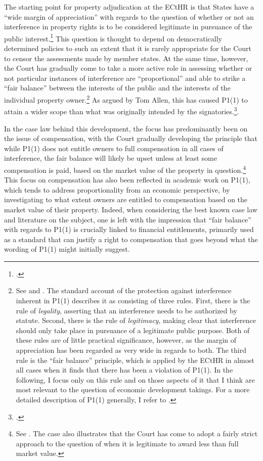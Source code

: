 \documentclass[12pt,a4paper]{book} %
\begin{document}
The starting point for property adjudication at the ECtHR is that States have a ``wide margin of appreciation'' with regards to the question of whether or not an interference in property rights is to be considered legitimate in pursuance of the public interest.\footcite[See][54]{james86} This question is thought to depend on democratically determined policies to such an extent that it is rarely appropriate for the Court to censor the assessments made by member states. At the same time, however, the Court has gradually come to take a more active role in assessing whether or not particular instances of interference are ``proportional'' and able to strike a ``fair balance'' between the interests of the public and the interests of the individual property owner.\footnote{See \cite[69]{sporrong82} and \cite[120]{james86}. The standard account of the protection against interference inherent in P1(1) describes it as consisting of three rules. First, there is the rule of {\it legality}, asserting that an interference needs to be authorized by statute. Second, there is the rule of {\it legitimacy}, making clear that interference should only take place in pursuance of a legitimate public purpose. Both of these rules are of little practical significance, however, as the margin of appreciation has been regarded as very wide in regards to both. The third rule is the ``fair balance'' principle, which is applied by the ECtHR in almost all cases when it finds that there has been a violation of P1(1). In the following, I focus only on this rule and on those aspects of it that I think are most relevant to the question of economic development takings. For a more detailed description of P1(1) generally, I refer to \cite{allen05}.} As argued by Tom Allen, this has caused P1(1) to attain a wider scope than what was originally intended by the signatories.\footcite[1055]{allen10}.

In the case law behind this development, the focus has predominantly been on the issue of compensation, with the Court gradually developing the principle that while P1(1) does not entitle owners to full compensation in all cases of interference, the fair balance will likely be upset unless at least some compensation is paid, based on the market value of the property in question.\footnote{See \cite[103]{scordino06}. The case also illustrates that the Court has come to adopt a fairly strict approach to the question of when it is legitimate to award less than full market value.} This focus on compensation has also been reflected in academic work on P1(1), which tends to address proportionality from an economic perspective, by investigating to what extent owners are entitled to compensation based on the market value of their property. Indeed, when considering the best known case law and literature on the subject, one is left with the impression that ``fair balance'' with regards to P1(1) is crucially linked to financial entitlements, primarily used as a standard that can justify a right to compensation that goes beyond what the wording of P1(1) might initially suggest.
\end{document}
